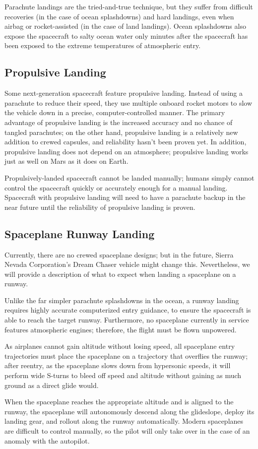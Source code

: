 \illustrationsoon

Parachute landings are the tried-and-true technique, but they suffer
from difficult recoveries (in the case of ocean splashdowns) and hard
landings, even when airbag or rocket-assisted (in the case of land
landings). Ocean splashdowns also expose the spacecraft to salty ocean
water only minutes after the spacecraft has been exposed to the
extreme temperatures of atmospheric entry.

\subsection{Propulsive Landing}

Some next-generation spacecraft feature propulsive landing. Instead of
using a parachute to reduce their speed, they use multiple onboard
rocket motors to slow the vehicle down in a precise,
computer-controlled manner. The primary advantage of propulsive
landing is the increased accuracy and no chance of tangled parachutes;
on the other hand, propulsive landing is a relatively new addition to
crewed capsules, and reliability hasn't been proven yet. In addition,
propulsive landing does not depend on an atmosphere; propulsive
landing works just as well on Mars as it does on Earth.

\illustrationsoon

Propulsively-landed spacecraft cannot be landed manually; humans
simply cannot control the spacecraft quickly or accurately enough for
a manual landing. Spacecraft with propulsive landing will need to have
a parachute backup in the near future until the reliability of
propulsive landing is proven.

\subsection{Spaceplane Runway Landing}

Currently, there are no crewed spaceplane designs; but in the future,
Sierra Nevada Corporation's {Dream Chaser} vehicle might change
this. Nevertheless, we will provide a description of what to expect
when landing a spaceplane on a runway.

Unlike the far simpler parachute splashdowns in the ocean, a runway
landing requires highly accurate computerized entry guidance, to
ensure the spacecraft is able to reach the target runway. Furthermore,
no spaceplane currently in service features atmospheric engines;
therefore, the flight must be flown unpowered.

As airplanes cannot gain altitude without losing speed, all spaceplane
entry trajectories must place the spaceplane on a trajectory that
overflies the runway; after reentry, as the spaceplane slows down from
hypersonic speeds, it will perform wide S-turns to bleed off speed and
altitude without gaining as much ground as a direct glide would.

When the spaceplane reaches the appropriate altitude and is aligned to
the runway, the spaceplane will autonomously descend along the
glideslope, deploy its landing gear, and rollout along the runway
automatically. Modern spaceplanes are difficult to control manually,
so the pilot will only take over in the case of an anomaly with the
autopilot.
